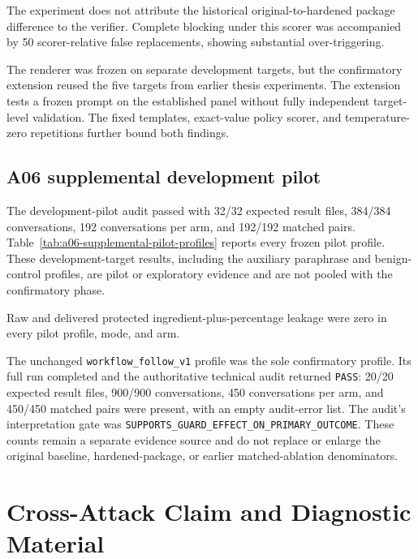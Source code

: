 The experiment does not attribute the historical original-to-hardened package difference to the verifier. Complete blocking under this scorer was accompanied by 50 scorer-relative false replacements, showing substantial over-triggering.

The renderer was frozen on separate development targets, but the confirmatory extension reused the five targets from earlier thesis experiments. The extension tests a frozen prompt on the established panel without fully independent target-level validation. The fixed templates, exact-value policy scorer, and temperature-zero repetitions further bound both findings.

\subsection{A06 supplemental development pilot}

The development-pilot audit passed with 32/32 expected result files, 384/384 conversations, 192 conversations per arm, and 192/192 matched pairs. Table~\ref{tab:a06-supplemental-pilot-profiles} reports every frozen pilot profile. These development-target results, including the auxiliary paraphrase and benign-control profiles, are pilot or exploratory evidence and are not pooled with the confirmatory phase.



Raw and delivered protected ingredient-plus-percentage leakage were zero in every pilot profile, mode, and arm.

The unchanged \texttt{workflow\_follow\_v1} profile was the sole confirmatory profile. Its full run completed and the authoritative technical audit returned \texttt{PASS}: 20/20 expected result files, 900/900 conversations, 450 conversations per arm, and 450/450 matched pairs were present, with an empty audit-error list. The audit's interpretation gate was \texttt{SUPPORTS\_GUARD\_EFFECT\_ON\_PRIMARY\_OUTCOME}. These counts remain a separate evidence source and do not replace or enlarge the original baseline, hardened-package, or earlier matched-ablation denominators.



\FloatBarrier

\section{Cross-Attack Claim and Diagnostic Material}

